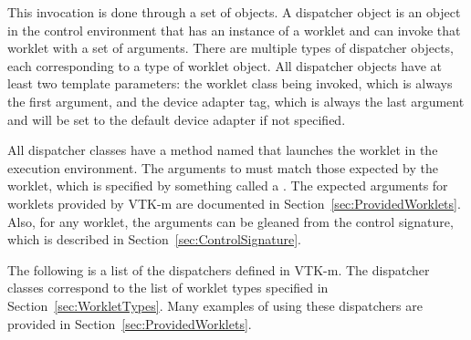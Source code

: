 This invocation is done through a set of
 objects. A dispatcher object is an
object in the control environment that has an instance of a worklet and can
invoke that worklet with a set of arguments. There are multiple types of
dispatcher objects, each corresponding to a type of worklet object. All
dispatcher objects have at least two template parameters: the worklet class
being invoked, which is always the first argument, and the device adapter
tag, which is always the last argument and will be set to the default
device adapter if not specified.

All dispatcher classes have a method named  that launches
the worklet in the execution environment.  The arguments to
 must match those expected by the worklet, which is
specified by something called a . The expected
arguments for worklets provided by VTK-m are documented in
Section~\ref{sec:ProvidedWorklets}. Also, for any worklet, the
 arguments can be gleaned from the control signature,
which is described in Section~\ref{sec:ControlSignature}.

The following is a list of the dispatchers defined in VTK-m. The
dispatcher classes correspond to the list of worklet types specified in
Section~\ref{sec:WorkletTypes}. Many examples of using these dispatchers
are provided in Section~\ref{sec:ProvidedWorklets}.

